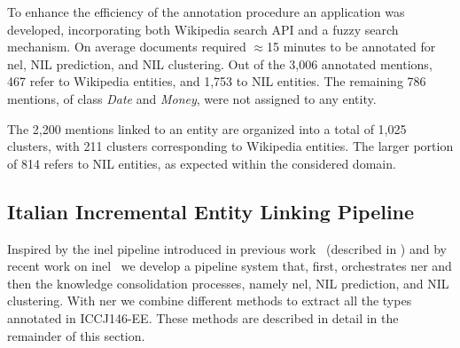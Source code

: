
To enhance the efficiency of the annotation procedure an application was developed, incorporating both Wikipedia search API and a fuzzy search mechanism. On average documents required $\approx$15 minutes to be annotated for \ac{nel}, NIL prediction, and NIL clustering. Out of the 3,006 annotated mentions, 467 refer to Wikipedia entities, and 1,753 to NIL entities. The remaining 786 mentions, of class \textit{Date} and \textit{Money}, were not assigned to any entity.


The 2,200 mentions linked to an entity are organized into a total of 1,025 clusters, with 211 clusters corresponding to Wikipedia entities.
The larger portion of 814 refers to NIL entities, as expected within the considered domain.


\subsection{Italian Incremental Entity Linking Pipeline}
\label{sec:entityextractionservice}

Inspired by the \ac{inel} pipeline introduced in previous work~\cite{ijckg2022} (described in ) and by recent work on \ac{inel}~\cite{Heist2023nastylinker,kassner-etal-2022-edin} we develop a pipeline system that, first, orchestrates \ac{ner} and then the knowledge consolidation processes, namely \ac{nel}, NIL prediction, and NIL clustering.
With \ac{ner} we combine different methods to extract all the types annotated in ICCJ146-EE. These methods are described in detail in the remainder of this section.

